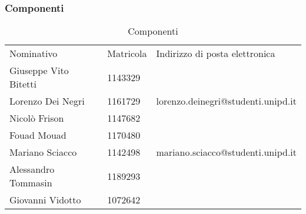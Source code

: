 		\subsubsection{Componenti}
			
			\begin{table}[h!]
				\centering
				\begin{tabular}{lll}
					Nominativo & Matricola & Indirizzo di posta elettronica \\
					Giuseppe Vito Bitetti & 1143329 & \\
					Lorenzo Dei Negri & 1161729 & lorenzo.deinegri@studenti.unipd.it \\
					Nicolò Frison & 1147682 & \\
					Fouad Mouad & 1170480 & \\
					Mariano Sciacco & 1142498 & mariano.sciacco@studenti.unipd.it \\
					Alessandro Tommasin & 1189293 & \\
					Giovanni Vidotto & 1072642 & \\
				\end{tabular}
				\caption{Componenti}
			\end{table}
		